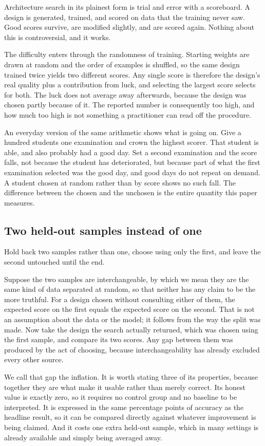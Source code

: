 \documentclass[11pt]{article}
\begin{document}
Architecture search in its plainest form is trial and error with a scoreboard. A design is generated,
trained, and scored on data that the training never saw. Good scores survive, are modified slightly, and
are scored again. Nothing about this is controversial, and it works.

The difficulty enters through the randomness of training. Starting weights are drawn at random and the
order of examples is shuffled, so the same design trained twice yields two different scores. Any single
score is therefore the design's real quality plus a contribution from luck, and selecting the largest
score selects for both. The luck does not average away afterwards, because the design was chosen partly
because of it. The reported number is consequently too high, and how much too high is not something a
practitioner can read off the procedure.

An everyday version of the same arithmetic shows what is going on. Give a hundred students one
examination and crown the highest scorer. That student is able, and also probably had a good
day. Set a second examination and the score falls, not because the student has deteriorated, but because
part of what the first examination selected was the good day, and good days do not repeat on demand. A
student chosen at random rather than by score shows no such fall. The difference between the chosen and
the unchosen is the entire quantity this paper measures.

\subsection{Two held-out samples instead of one}

Hold back two samples rather than one, choose using only the first, and leave the second untouched until
the end.

Suppose the two samples are interchangeable, by which we mean they are the same kind of data separated
at random, so that neither has any claim to be the more truthful. For a design chosen without consulting
either of them, the expected score on the first equals the expected score on the second. That is not an
assumption about the data or the model; it follows from the way the split was made. Now take the design
the search actually returned, which was chosen using the first sample, and compare its two scores. Any
gap between them was produced by the act of choosing, because interchangeability has already excluded
every other source.

We call that gap the inflation. It is worth stating three of its properties, because together they are
what make it usable rather than merely correct. Its honest value is exactly zero, so it requires no
control group and no baseline to be interpreted. It is expressed in the same percentage points of
accuracy as the headline result, so it can be compared directly against whatever improvement is being
claimed. And it costs one extra held-out sample, which in many settings is already available and simply
being averaged away.
\end{document}
